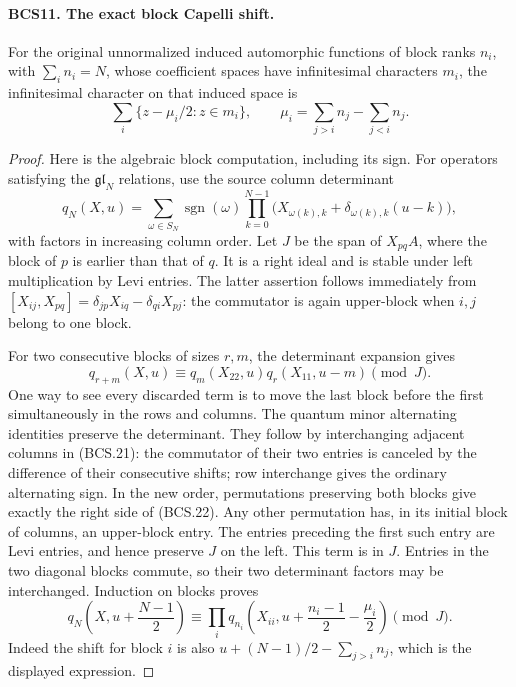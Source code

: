 \documentclass[11pt,a4paper]{article}
\numberwithin{equation}{section}
\theoremstyle{remark}\newtheorem{remark}[theorem]{Remark}
\begin{document}
\paragraph{BCS11. The exact block Capelli shift.}
\label{claim:BCS11}
For the original unnormalized induced automorphic functions of block
ranks \(n_i\), with \(\sum_i n_i=N\), whose coefficient spaces
have infinitesimal characters \(m_i\), the infinitesimal character
on that induced space is
\[
       \sum_i\{z-\mu_i/2:z\in m_i\},\qquad
       \mu_i=\sum_{j>i}n_j-\sum_{j<i}n_j.
 \tag{BCS.20}
\]
\begin{proof}
Here is the algebraic block computation, including its sign.
For operators satisfying the \(\mathfrak{gl}_N\) relations, use
the source column determinant
\[
 q_N(X,u)=\sum_{\omega\in S_N}\operatorname{sgn}(\omega)
       \prod_{k=0}^{N-1}
       \bigl(X_{\omega(k),k}+\delta_{\omega(k),k}(u-k)\bigr),
 \tag{BCS.21}
\]
with factors in increasing column order.  Let \(J\) be the span
of \(X_{pq}A\), where the block of \(p\) is earlier than that of
\(q\).  It is a right ideal and is stable under left multiplication
by Levi entries.  The latter assertion follows immediately from
\([X_{ij},X_{pq}]=\delta_{jp}X_{iq}-\delta_{qi}X_{pj}\): the
commutator is again upper-block when \(i,j\) belong to one block.

For two consecutive blocks of sizes \(r,m\), the determinant
expansion gives
\[
 q_{r+m}(X,u)\equiv
       q_m(X_{22},u)q_r(X_{11},u-m)\pmod J.
 \tag{BCS.22}
\]
One way to see every discarded term is to move the last block before
the first simultaneously in the rows and columns.  The quantum
minor alternating identities preserve the determinant.  They follow
by interchanging adjacent columns in (BCS.21): the commutator of
their two entries is canceled by the difference of their consecutive
shifts; row interchange gives the ordinary alternating sign.  In the
new order, permutations preserving both blocks give exactly the
right side of (BCS.22).  Any other permutation has, in its initial
block of columns, an upper-block entry.  The entries preceding the
first such entry are Levi entries, and hence preserve \(J\) on the
left.  This term is in \(J\).  Entries in the two diagonal blocks
commute, so their two determinant factors may be interchanged.
Induction on blocks proves
\[
 q_N\!\left(X,u+\frac{N-1}{2}\right)
 \equiv\prod_i q_{n_i}\!\left(X_{ii},
           u+\frac{n_i-1}{2}-\frac{\mu_i}{2}\right)\pmod J.
 \tag{BCS.23}
\]
Indeed the shift for block \(i\) is also
\(u+(N-1)/2-\sum_{j>i}n_j\), which is the displayed expression.


\end{proof}
\end{document}
